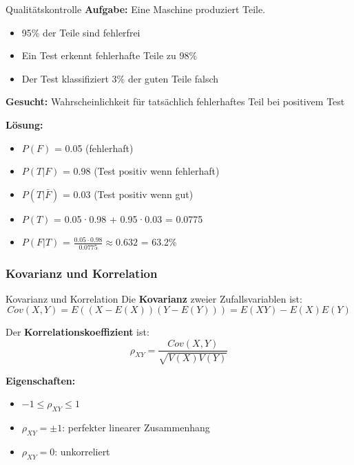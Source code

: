 \begin{example2}{Qualitätskontrolle}
\textbf{Aufgabe:} Eine Maschine produziert Teile. 
\begin{itemize}
\item 95\% der Teile sind fehlerfrei
\item Ein Test erkennt fehlerhafte Teile zu 98\%
\item Der Test klassifiziert 3\% der guten Teile falsch
\end{itemize}

\textbf{Gesucht:} Wahrscheinlichkeit für tatsächlich fehlerhaftes Teil bei positivem Test

\textbf{Lösung:}
\begin{itemize}
\item $P(F)$ = 0.05 (fehlerhaft)
\item $P(T|F)$ = 0.98 (Test positiv wenn fehlerhaft)
\item $P(T|\bar{F})$ = 0.03 (Test positiv wenn gut)
\item $P(T)$ = 0.05·0.98 + 0.95·0.03 = 0.0775
\item $P(F|T)$ = $\frac{0.05 \cdot 0.98}{0.0775} \approx 0.632$ = 63.2\%
\end{itemize}
\end{example2}


\subsubsection{Kovarianz und Korrelation}

\begin{definition}{Kovarianz und Korrelation}
Die \textbf{Kovarianz} zweier Zufallsvariablen ist:
$$Cov(X,Y) = E((X-E(X))(Y-E(Y))) = E(XY) - E(X)E(Y)$$

Der \textbf{Korrelationskoeffizient} ist:
$$\rho_{XY} = \frac{Cov(X,Y)}{\sqrt{V(X)V(Y)}}$$

\textbf{Eigenschaften:}
\begin{itemize}
    \item $-1 \leq \rho_{XY} \leq 1$
    \item $\rho_{XY} = \pm 1$: perfekter linearer Zusammenhang
    \item $\rho_{XY} = 0$: unkorreliert
\end{itemize}
\end{definition}

